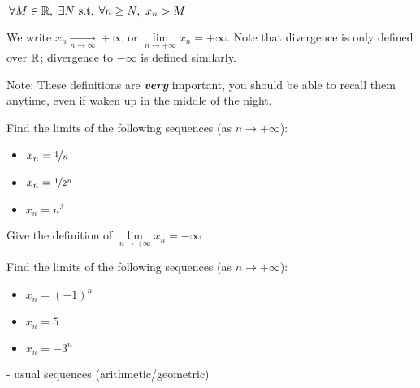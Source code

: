 \begin{definition}
    $\,\forall M \in \mathbb{R}, \ \exists N \text{ s.t. } \forall n \geq N, \ x_n > M$
\end{definition}
We write $x_n \xrightarrow[n \to \infty]{} +\infty \text{ or } \lim\limits_{n \to +\infty} x_n = +\infty$.
Note that divergence is only defined over $\mathbb{R}$; divergence to $-\infty$ is defined similarly.

Note: These definitions are \textbf{\textit{very}} important, you should be able to recall them anytime, even if waken up in the middle of the night.

\begin{question}
    Find the limits of the following sequences (as $n \to +\infty$):
    \begin{itemize}
        \item $x_n = \nicefrac{1}{n}$
        \item $x_n = \nicefrac{1}{2^n}$
        \item $x_n = n^3$
    \end{itemize}
\end{question}
\begin{question}
    Give the definition of $\lim\limits_{n \to +\infty} x_n = -\infty$
\end{question}
\begin{question}
    Find the limits of the following sequences (as $n \to +\infty$):
    \begin{itemize}
        \item $x_n = (-1)^n$
        \item $x_n = 5$
        \item $x_n = -3^n$
    \end{itemize}
\end{question}


- usual sequences (arithmetic/geometric)